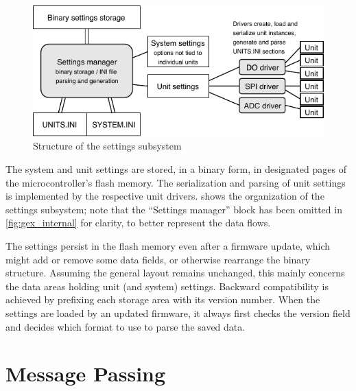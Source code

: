 \begin{figure}[h]
	\centering
	\includegraphics[scale=1.2] {img/settings-storage.pdf}
	\caption{\label{fig:settings_storage}Structure of the settings subsystem}
\end{figure}

The system and unit settings are stored, in a binary form, in designated pages of the microcontroller's flash memory. The serialization and parsing of unit settings is implemented by the respective unit drivers.  shows the organization of the settings subsystem; note that the ``Settings manager'' block has been omitted in \cref{fig:gex_internal} for clarity, to better represent the data flows. 

The settings persist in the flash memory even after a firmware update, which might add or remove some data fields, or otherwise rearrange the binary structure. Assuming the general layout remains unchanged, this mainly concerns the data areas holding unit (and system) settings. Backward compatibility is achieved by prefixing each storage area with its version number. When the settings are loaded by an updated firmware, it always first checks the version field and decides which format to use to parse the saved data.

%


\section{Message Passing} \label{sec:message_passing}

